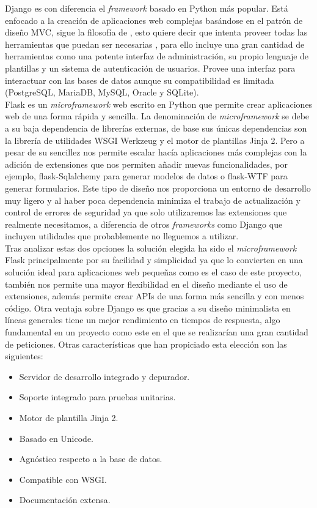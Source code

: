 \documentclass[../proyecto.tex]{subfiles}
\begin{document}
Django es con diferencia el \textit{framework} basado en Python más popular. Está enfocado a la creación de aplicaciones web complejas basándose en el patrón de diseño MVC, sigue la filosofía de , esto quiere decir que intenta proveer todas las herramientas que puedan ser necesarias , para ello incluye una gran cantidad de herramientas como una potente interfaz de administración, su propio lenguaje de plantillas y un sistema de autenticación de usuarios. Provee una interfaz para interactuar con las bases de datos aunque su compatibilidad es limitada (PostgreSQL, MariaDB, MySQL, Oracle y SQLite).\\

Flask es un \textit{microframework} web escrito en Python que permite crear aplicaciones web de una forma rápida y sencilla. La denominación de \textit{microframework} se debe a su baja dependencia de librerías externas, de base sus únicas dependencias son la librería de utilidades WSGI Werkzeug y el motor de plantillas Jinja 2. Pero a pesar de su sencillez nos permite escalar hacía aplicaciones más complejas con la adición de extensiones que nos permiten añadir nuevas funcionalidades, por ejemplo, flask-Sqlalchemy para generar modelos de datos o flask-WTF para generar formularios. Este tipo de diseño nos proporciona un entorno de desarrollo muy ligero y al haber poca dependencia minimiza el trabajo de actualización y control de errores de seguridad ya que solo utilizaremos las extensiones que realmente necesitamos, a diferencia de otros \textit{frameworks} como Django que incluyen utilidades que probablemente no lleguemos a utilizar.\\

Tras analizar estas dos opciones la solución elegida ha sido el \textit{microframework} Flask principalmente por su facilidad y simplicidad ya que lo convierten en una solución ideal para aplicaciones web pequeñas como es el caso de este proyecto, también nos permite una mayor flexibilidad en el diseño mediante el uso de extensiones, además permite crear APIs de una forma más sencilla y con menos código. Otra ventaja sobre Django es que gracias a su diseño minimalista en líneas generales tiene un mejor rendimiento en tiempos de respuesta, algo fundamental en un proyecto como este en el que se realizarían una gran cantidad de peticiones. Otras características que han propiciado esta elección son las siguientes:

\begin{itemize}
  \item Servidor de desarrollo integrado y depurador.
  \item Soporte integrado para pruebas unitarias.
  \item Motor de plantilla Jinja 2.
  \item Basado en Unicode.
  \item Agnóstico respecto a la base de datos.
  \item Compatible con WSGI.
  \item Documentación extensa.
\end{itemize}
\end{document}
